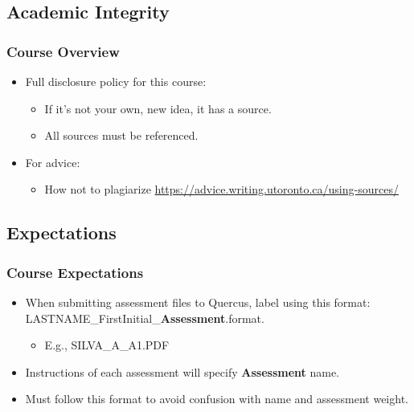 \documentclass[11pt]{beamer}
\begin{document}
\subsection{Academic Integrity}
\begin{frame}
\frametitle{Course Overview}
\begin{itemize}
\item Full disclosure policy for this course:
\vspace{0.1in}
\begin{itemize}
\item If it's not your own, new idea, it has a source.
\vspace{0.1in}
\item All sources must be referenced.
\end{itemize}
\vspace{0.2in}
\item For advice:
\vspace{0.1in}
\begin{itemize}
\item How not to plagiarize \url{https://advice.writing.utoronto.ca/using-sources/}
\end{itemize}
\end{itemize}
\end{frame}


\subsection{Expectations}
\begin{frame}
\frametitle{Course Expectations}
\begin{itemize}
\item When submitting assessment files to Quercus, label  using this format: LASTNAME\_FirstInitial\_\textbf{Assessment}.format.
\vspace{0.1in}
\begin{itemize}
\item E.g., SILVA\_A\_A1.PDF
\vspace{0.1in}
\end{itemize}
\item Instructions of each assessment will specify \textbf{Assessment} name.
\vspace{0.1in}
\item Must follow this format to avoid confusion with name and assessment weight. 
\end{itemize}
\end{frame}
\end{document}

